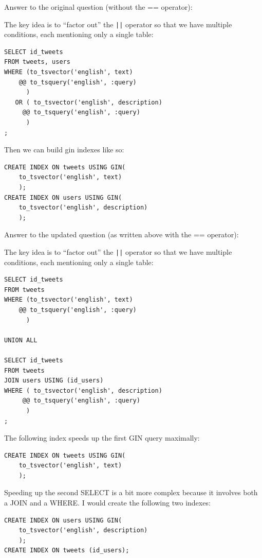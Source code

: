 \documentclass[12pt]{exam}
\theoremstyle{definition}
\begin{document}
\begin{questions}
        \begin{solution}
            Answer to the original question (without the == operator):

            The key idea is to ``factor out'' the \lstinline{||} operator so that we have multiple conditions, each mentioning only a single table:
\begin{lstlisting}
SELECT id_tweets
FROM tweets, users
WHERE (to_tsvector('english', text) 
    @@ to_tsquery('english', :query)
      )
   OR ( to_tsvector('english', description)
     @@ to_tsquery('english', :query)
      )
;
\end{lstlisting}
Then we can build gin indexes like so:
\begin{lstlisting}
CREATE INDEX ON tweets USING GIN(
    to_tsvector('english', text)
    );
CREATE INDEX ON users USING GIN(
    to_tsvector('english', description)
    );
\end{lstlisting}


            Answer to the updated question (as written above with the == operator):

            The key idea is to ``factor out'' the \lstinline{||} operator so that we have multiple conditions, each mentioning only a single table:
\begin{lstlisting}
SELECT id_tweets
FROM tweets
WHERE (to_tsvector('english', text) 
    @@ to_tsquery('english', :query)
      )

UNION ALL

SELECT id_tweets
FROM tweets
JOIN users USING (id_users)
WHERE ( to_tsvector('english', description)
     @@ to_tsquery('english', :query)
      )
;
\end{lstlisting}
The following index speeds up the first GIN query maximally:
\begin{lstlisting}
CREATE INDEX ON tweets USING GIN(
    to_tsvector('english', text)
    );
\end{lstlisting}
Speeding up the second SELECT is a bit more complex because it involves both a JOIN and a WHERE.
I would create the following two indexes:
\begin{lstlisting}
CREATE INDEX ON users USING GIN(
    to_tsvector('english', description)
    );
CREATE INDEX ON tweets (id_users);
\end{lstlisting}
        \end{solution}

\end{questions}
\end{document}
